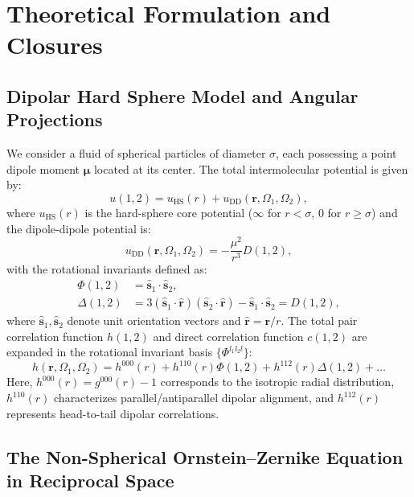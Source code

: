 \documentclass[11pt,a4paper]{article}
\begin{document}
\section{Theoretical Formulation and Closures}

\subsection{Dipolar Hard Sphere Model and Angular Projections}

We consider a fluid of spherical particles of diameter $\sigma$, each possessing a point dipole moment $\bm{\mu}$ located at its center. The total intermolecular potential is given by:
\begin{equation}
    u(1, 2) = u_{\text{HS}}(r) + u_{\text{DD}}(\mathbf{r}, \Omega_1, \Omega_2),
\end{equation}
where $u_{\text{HS}}(r)$ is the hard-sphere core potential ($\infty$ for $r < \sigma$, $0$ for $r \ge \sigma$) and the dipole-dipole potential is:
\begin{equation}
    u_{\text{DD}}(\mathbf{r}, \Omega_1, \Omega_2) = -\frac{\mu^2}{r^3} D(1, 2),
\end{equation}
with the rotational invariants defined as:
\begin{align}
    \Phi(1, 2) &= \hat{\mathbf{s}}_1 \cdot \hat{\mathbf{s}}_2, \\
    \Delta(1, 2) &= 3(\hat{\mathbf{s}}_1 \cdot \hat{\mathbf{r}})(\hat{\mathbf{s}}_2 \cdot \hat{\mathbf{r}}) - \hat{\mathbf{s}}_1 \cdot \hat{\mathbf{s}}_2 = D(1, 2),
\end{align}
where $\hat{\mathbf{s}}_1, \hat{\mathbf{s}}_2$ denote unit orientation vectors and $\hat{\mathbf{r}} = \mathbf{r}/r$. The total pair correlation function $h(1, 2)$ and direct correlation function $c(1, 2)$ are expanded in the rotational invariant basis $\{ \Phi^{l_1 l_2 l} \}$:
\begin{equation}
    h(\mathbf{r}, \Omega_1, \Omega_2) = h^{000}(r) + h^{110}(r)\Phi(1, 2) + h^{112}(r)\Delta(1, 2) + \dots
\end{equation}
Here, $h^{000}(r) = g^{000}(r) - 1$ corresponds to the isotropic radial distribution, $h^{110}(r)$ characterizes parallel/antiparallel dipolar alignment, and $h^{112}(r)$ represents head-to-tail dipolar correlations.

\subsection{The Non-Spherical Ornstein--Zernike Equation in Reciprocal Space}
\end{document}
